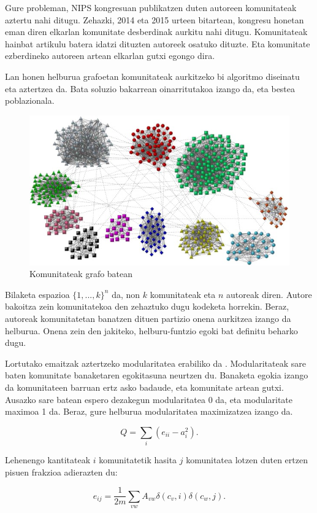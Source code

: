 \documentclass[sigconf]{acmart}
\begin{document}
Gure probleman, NIPS kongresuan publikatzen duten autoreen komunitateak aztertu nahi ditugu. Zehazki, 2014 eta 2015 urteen bitartean, kongresu honetan eman diren elkarlan komunitate desberdinak aurkitu nahi ditugu. Komunitateak hainbat artikulu batera idatzi dituzten autoreek osatuko dituzte. Eta komunitate ezberdineko autoreen artean elkarlan gutxi egongo dira.

Lan honen helburua grafoetan komunitateak aurkitzeko bi algoritmo diseinatu eta aztertzea da. Bata soluzio bakarrean oinarritutakoa izango da, eta bestea poblazionala.

\begin{figure}
    \centering
    \includegraphics[width=0.7\linewidth]{example.jpg}
    \caption{Komunitateak grafo batean}
    \label{fig:graph}
\end{figure}


Bilaketa espazioa $\{1,...,k\}^n$ da, non $k$ komunitateak eta $n$ autoreak diren. Autore bakoitza zein komunitatekoa den zehaztuko dugu kodeketa horrekin. Beraz, autoreak komunitatetan banatzen dituen partizio onena aurkitzea izango da helburua. Onena zein den jakiteko, helburu-funtzio egoki bat definitu beharko dugu.

Lortutako emaitzak aztertzeko modularitatea erabiliko da \cite{clauset2004finding}. Modularitateak sare baten komunitate banaketaren egokitasuna neurtzen du. Banaketa egokia izango da komunitateen barruan ertz asko badaude, eta komunitate artean gutxi. Ausazko sare batean espero dezakegun modularitatea 0 da, eta modularitate maximoa 1 da. Beraz, gure helburua modularitatea maximizatzea izango da.

\begin{equation}
Q=\sum_{i} (e_{ii} - a_i^2).
\end{equation}

Lehenengo kantitateak $i$ komunitatetik hasita $j$ komunitatea lotzen duten ertzen pisuen frakzioa adierazten du:

\begin{equation}
e_{ij}=\frac{1}{2m}\sum_{vw}A_{vw}\delta(c_v,i)\delta(c_w,j).
\end{equation}
\end{document}
